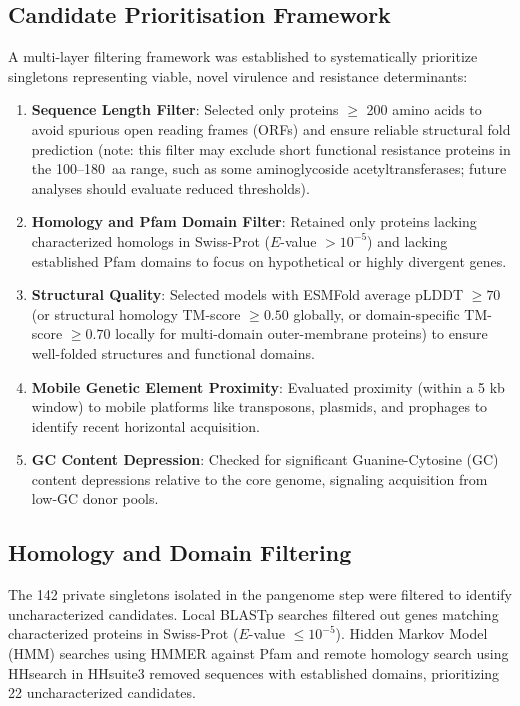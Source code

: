 \documentclass[pdflatex,sn-mathphys-num]{sn-jnl}
\begin{document}
\subsection{Candidate Prioritisation Framework}\label{subsec:prioritization}
A multi-layer filtering framework was established to systematically prioritize singletons representing viable, novel virulence and resistance determinants:
\begin{enumerate}
\item \textbf{Sequence Length Filter}: Selected only proteins $\ge$ 200 amino acids to avoid spurious open reading frames (ORFs) and ensure reliable structural fold prediction (note: this filter may exclude short functional resistance proteins in the 100--180~aa range, such as some aminoglycoside acetyltransferases; future analyses should evaluate reduced thresholds).
\item \textbf{Homology and Pfam Domain Filter}: Retained only proteins lacking characterized homologs in Swiss-Prot ($E$-value $> 10^{-5}$) and lacking established Pfam domains to focus on hypothetical or highly divergent genes.
\item \textbf{Structural Quality}: Selected models with ESMFold average pLDDT $\ge 70$ (or structural homology TM-score $\ge 0.50$ globally, or domain-specific TM-score $\ge 0.70$ locally for multi-domain outer-membrane proteins) to ensure well-folded structures and functional domains.
\item \textbf{Mobile Genetic Element Proximity}: Evaluated proximity (within a 5 kb window) to mobile platforms like transposons, plasmids, and prophages to identify recent horizontal acquisition.
\item \textbf{GC Content Depression}: Checked for significant Guanine-Cytosine (GC) content depressions relative to the core genome, signaling acquisition from low-GC donor pools.
\end{enumerate}

\subsection{Homology and Domain Filtering}\label{subsec:homology_filtering}
The 142 private singletons isolated in the pangenome step were filtered to identify uncharacterized candidates. Local BLASTp \cite{altschul1990basic} searches filtered out genes matching characterized proteins in Swiss-Prot ($E$-value $\le 10^{-5}$). Hidden Markov Model (HMM) searches using HMMER \cite{mistry2021hmmer} against Pfam \cite{mistry2021pfam} and remote homology search using HHsearch in HHsuite3 \cite{meier2019hhsuite} removed sequences with established domains, prioritizing 22 uncharacterized candidates.
\end{document}

